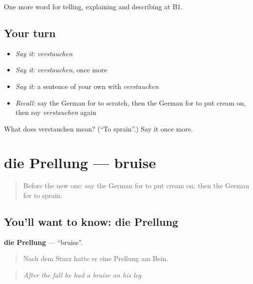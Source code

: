 \begin{grammarlens}[title={What you've built}]
One more word for telling, explaining and describing at B1.
\end{grammarlens}

\subsection*{Your turn}
\begin{itemize}
\raggedright
  \item \emph{Say it:} \emph{verstauchen}
  \item \emph{Say it:} \emph{verstauchen}, once more
  \item \emph{Say it:} a sentence of your own with \emph{verstauchen}
  \item \emph{Recall:} say the German for to scratch, then the German for to put cream on, then say \emph{verstauchen} again
\end{itemize}

\begin{tcolorbox}[breakable,colback=teal!4,colframe=teal!35!black,title={Before you move on}]
What does verstauchen mean? (\textquotedblleft{}To sprain\textquotedblright{}.) Say it once more.
\end{tcolorbox}
\section[die Prellung]{die Prellung — bruise}

\label{lesson:GE-C482-prellung}



\begin{quote}
Before the new one: say the German for to put cream on, then the German for to sprain.
\end{quote}

\subsection*{You'll want to know: die Prellung}
\textbf{die Prellung} — \textquotedblleft{}bruise\textquotedblright{}.

\begin{quote}
Nach dem Sturz hatte er eine Prellung am Bein.
\end{quote}

\begin{quote}
\emph{After the fall he had a bruise on his leg.}
\end{quote}

